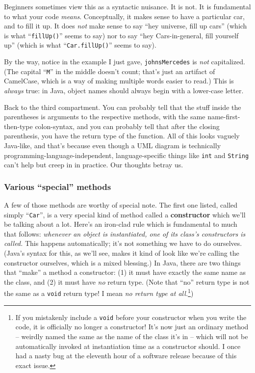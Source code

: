 Beginners sometimes view this as a syntactic nuisance. It is not. It is
fundamental to what your code \textit{means}. Conceptually, it makes sense to
have a particular car, and to fill it up. It does \textit{not} make sense to
say ``hey universe, fill up cars'' (which is what ``\texttt{fillUp()}'' seems to
say) nor to say ``hey Cars-in-general, fill yourself up'' (which is what
``\texttt{Car.fillUp()}'' seems to say).

By the way, notice in the example I just gave, \texttt{johnsMercedes} is
\textit{not} capitalized. (The capital ``\texttt{M}'' in the middle doesn't
count; that's just an artifact of CamelCase, which is a way of making multiple
words easier to read.) This is \textit{always} true: in Java, object names
should always begin with a lower-case letter.

Back to the third compartment. You can probably tell that the stuff inside the
parentheses is arguments to the respective methods, with the same
name-first-then-type colon-syntax, and you can probably tell that after the
closing parenthesis, you have the return type of the function. All of this
looks vaguely Java-like, and that's because even though a UML diagram is
technically programming-language-independent, language-specific things like
\texttt{int} and \texttt{String} can't help but creep in in practice. Our
thoughts betray us.

\subsubsection{Various ``special'' methods}
\label{page:instantiateConstructor}

A few of those methods are worthy of special note. The first one listed,
called simply ``\texttt{Car}'', is a very special kind of method called a
\textbf{constructor} which we'll be talking about a lot. Here's an iron-clad
rule which is fundamental to much that follows: \textit{whenever an object is
instantiated, one of its class's constructors is called.} This happens
automatically; it's not something we have to do ourselves. (Java's syntax for
this, as we'll see, makes it kind of look like we're calling the constructor
ourselves, which is a mixed blessing.) In Java, there are two things that
``make'' a method a constructor: (1) it must have exactly the same name as the
class, and (2) it must have \textit{no} return type. (Note that ``no'' return
type is not the same as a \texttt{void} return type! I mean \textit{no return
type at all.}\footnote{If you mistakenly include a \texttt{void} before your
constructor when you write the code, it is officially no longer a constructor!
It's now just an ordinary method -- weirdly named the same as the name of the
class it's in -- which will not be automatically invoked at instantiation time
as a constructor should. I once had a nasty bug at the eleventh hour of a
software release because of this exact issue.})

